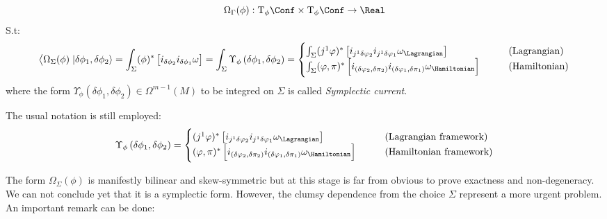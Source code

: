 \documentclass[a4paper,12pt,fleqn]{scrartcl}  %
\begin{document}
\begin{definition}\label{Def:presymform}
	\begin{displaymath}
		\Omega_\Gamma ( \phi ) : \textrm{T}_\phi \Conf \times \textrm{T}_\phi \Conf \rightarrow \Real
\end{displaymath}		
	S.t:
	\begin{displaymath}
		\left\langle	\Omega_\Sigma ( \phi) \right.\left\lvert \delta \phi_1 , \delta \phi_2 \right\rangle =		
		\int_\Sigma (\phi)^\ast \left[ i_{\delta\phi_2} i_{\delta \phi_1} \omega \right] =
		\int_\Sigma \Upsilon_\phi \left( \delta \phi_1 , \delta \phi_2 \right) = 
		\begin{cases}
			\int_\Sigma (j^1 \varphi)^\ast \left[ i_{j^1 \delta\varphi_2} i_{j^1 \delta \varphi_1} \omega_\Lagrangian \right]
			& \qquad \textrm{(Lagrangian)} \\
			\int_\Sigma (\varphi, \pi)^\ast \left[ i_{( \delta \varphi_2, \delta \pi_2)} i_{( \delta \varphi_1, \delta \pi_1)} \omega_\Hamiltonian \right]
			& \qquad \textrm{(Hamiltonian)} 		
		\end{cases}
	\end{displaymath}
where the form $\Upsilon_\phi \left( \delta \phi_1 , \delta \phi_2 \right)  \in \Omega^{m-1}(M)$ to be integred on $\Sigma$ is called \emph{Symplectic current}.
\end{definition}
\begin{notation}
	The usual notation is still employed:
	\begin{displaymath}
		\Upsilon_\phi \left( \delta \phi_1 , \delta \phi_2 \right) = 
			\begin{cases}
				(j^1 \varphi)^\ast \left[ i_{j^1 \delta\varphi_2} i_{j^1 \delta \varphi_1} \omega_\Lagrangian \right]
				& \qquad \textrm{(Lagrangian framework)} \\
				(\varphi, \pi)^\ast \left[ i_{( \delta \varphi_2, \delta \pi_2)} i_{( \delta \varphi_1, \delta \pi_1)} \omega_\Hamiltonian \right]
				& \qquad \textrm{(Hamiltonian framework)} 		
			\end{cases}	
	\end{displaymath}

\end{notation}


The form $\Omega_\Sigma (\phi)$ is manifestly bilinear and skew-symmetric but at this stage is far from obvious to prove exactness and non-degeneracy. We can not conclude yet that it is a symplectic form.
However, the clumsy dependence from the choice $\Sigma$ represent a more urgent problem.
An important remark can be done:
\end{document}
